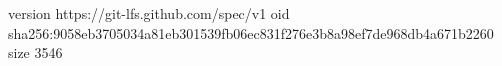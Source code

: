 version https://git-lfs.github.com/spec/v1
oid sha256:9058eb3705034a81eb301539fb06ec831f276e3b8a98ef7de968db4a671b2260
size 3546
